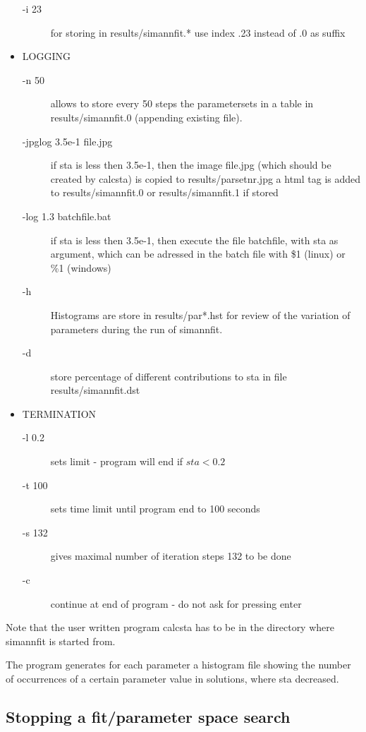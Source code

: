 \begin{itemize}
\begin{description}
\item[-i 23] for storing in results/simannfit.* use index .23 instead of .0 as suffix 
\end{description}
\item LOGGING 
\begin{description}
\item[-n 50]allows to store every 50 steps the parametersets in a table in  {\prg results/simannfit.0}
 (appending existing file).
\item[-jpglog 3.5e-1 file.jpg] if sta is less then 3.5e-1, then the image file.jpg 
            (which should be created by calcsta) is copied to results/parsetnr.jpg
            a html tag is added to results/simannfit.0 or results/simannfit.1 if 
	    stored
\item[-log 1.3 batchfile.bat] if sta is less then 3.5e-1, then execute the file 
             batchfile, with sta as argument, which can be adressed in the batch
	     file with \$1 (linux) or  \%1 (windows)
\item[-h]       Histograms are store in results/par*.hst for review of the variation 
             of parameters during the run of simannfit. 
\item[-d ]      store percentage of different contributions to sta in file results/simannfit.dst 
\end{description}
\item TERMINATION 
\begin{description}
\item[-l 0.2] sets limit - program will end if $sta<0.2$
\item[-t 100] sets time limit until program end to 100 seconds
\item[-s 132] gives maximal number of iteration steps 132 to be done
\item[-c] continue at end of program - do not ask for pressing enter 
\end{description}
\end{itemize}
Note that the user written program {\prg calcsta} has to be in the
directory where {\prg simannfit} is started from.

The program generates for each parameter a histogram file showing the number of occurrences
of a certain parameter value in solutions, where sta decreased.

\subsection{Stopping a fit/parameter space search}

